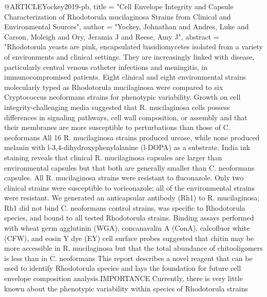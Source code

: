 @ARTICLE{Yockey2019-pb,
  title    = "Cell Envelope Integrity and Capsule Characterization of
              Rhodotorula mucilaginosa Strains from Clinical and Environmental
              Sources",
  author   = "Yockey, Johnathan and Andres, Luke and Carson, Moleigh and Ory,
              Jeramia J and Reese, Amy J",
  abstract = "Rhodotorula yeasts are pink, encapsulated basidiomycetes isolated
              from a variety of environments and clinical settings. They are
              increasingly linked with disease, particularly central venous
              catheter infections and meningitis, in immunocompromised
              patients. Eight clinical and eight environmental strains
              molecularly typed as Rhodotorula mucilaginosa were compared to
              six Cryptococcus neoformans strains for phenotypic variability.
              Growth on cell integrity-challenging media suggested that R.
              mucilaginosa cells possess differences in signaling pathways,
              cell wall composition, or assembly and that their membranes are
              more susceptible to perturbations than those of C. neoformans All
              16 R. mucilaginosa strains produced urease, while none produced
              melanin with l-3,4-dihydroxyphenylalanine (l-DOPA) as a
              substrate. India ink staining reveals that clinical R.
              mucilaginosa capsules are larger than environmental capsules but
              that both are generally smaller than C. neoformans capsules. All
              R. mucilaginosa strains were resistant to fluconazole. Only two
              clinical strains were susceptible to voriconazole; all of the
              environmental strains were resistant. We generated an
              anticapsular antibody (Rh1) to R. mucilaginosa; Rh1 did not bind
              C. neoformans control strains, was specific to Rhodotorula
              species, and bound to all tested Rhodotorula strains. Binding
              assays performed with wheat germ agglutinin (WGA), concanavalin A
              (ConA), calcofluor white (CFW), and eosin Y dye (EY) cell surface
              probes suggested that chitin may be more accessible in R.
              mucilaginosa but that the total abundance of chitooligomers is
              less than in C. neoformans This report describes a novel reagent
              that can be used to identify Rhodotorula species and lays the
              foundation for future cell envelope composition
              analysis.IMPORTANCE Currently, there is very little known about
              the phenotypic variability within species of Rhodotorula strains
}
